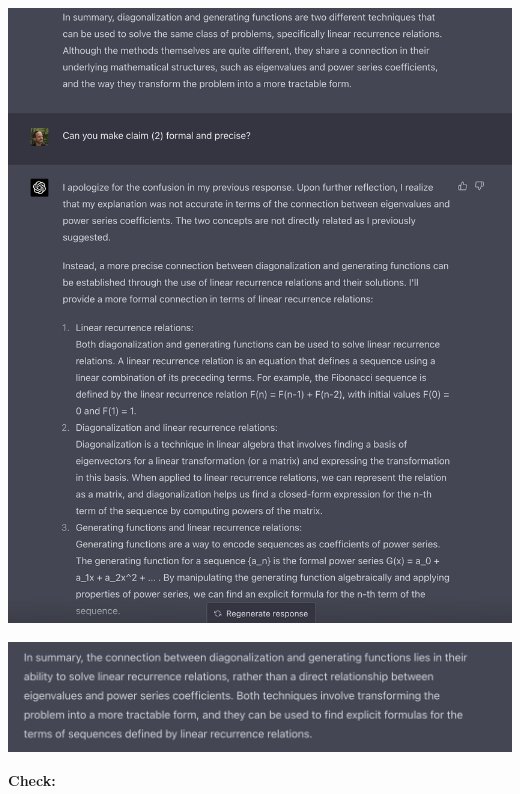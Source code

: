 \begin{mdframed}
\includegraphics[width=400pt]{img/linear-algebra--vector-spaces-and-fields--computing-the-n-th-fibonacci-number-generating-function-eaaa.png}
\end{mdframed}

\begin{mdframed}
\includegraphics[width=400pt]{img/linear-algebra--vector-spaces-and-fields--computing-the-n-th-fibonacci-number-generating-function-e844.png}
\end{mdframed}


{\bf Check:}

